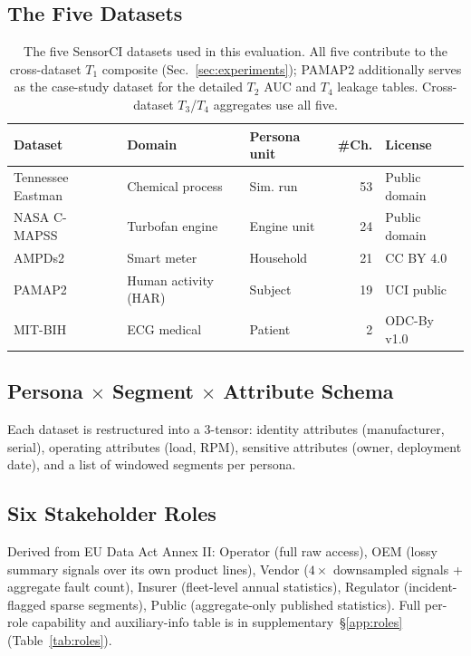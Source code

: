 \documentclass{article}
\theoremstyle{remark}
\begin{document}
\subsection{The Five Datasets}

\begin{table}[h]
\centering
\caption{The five SensorCI datasets used in this evaluation. All five contribute to the cross-dataset $T_1$ composite (Sec.~\ref{sec:experiments}); PAMAP2 additionally serves as the case-study dataset for the detailed $T_2$ AUC and $T_4$ leakage tables. Cross-dataset $T_3$/$T_4$ aggregates use all five.}
\label{tab:datasets}
\small
\setlength{\tabcolsep}{4pt}
\begin{tabular}{@{}lllrl@{}}
\toprule
Dataset & Domain & Persona unit & \#Ch. & License \\
\midrule
Tennessee Eastman~\cite{tep1993,tep_ext} & Chemical process & Sim. run & 53 & Public domain \\
NASA C-MAPSS~\cite{cmapss} & Turbofan engine & Engine unit & 24 & Public domain \\
AMPDs2~\cite{ampds2} & Smart meter & Household & 21 & CC BY 4.0 \\
PAMAP2~\cite{pamap2} & Human activity (HAR) & Subject & 19 & UCI public \\
MIT-BIH~\cite{mitbih} & ECG medical & Patient & 2 & ODC-By v1.0 \\
\bottomrule
\end{tabular}
\end{table}

\subsection{Persona $\times$ Segment $\times$ Attribute Schema}
Each dataset is restructured into a 3-tensor: identity attributes (manufacturer, serial), operating attributes (load, RPM), sensitive attributes (owner, deployment date), and a list of windowed segments per persona.

\subsection{Six Stakeholder Roles}
Derived from EU Data Act Annex II: Operator (full raw access), OEM (lossy summary signals over its own product lines), Vendor ($4\times$ downsampled signals + aggregate fault count), Insurer (fleet-level annual statistics), Regulator (incident-flagged sparse segments), Public (aggregate-only published statistics). Full per-role capability and auxiliary-info table is in supplementary~\S\ref{app:roles} (Table~\ref{tab:roles}).
\end{document}
